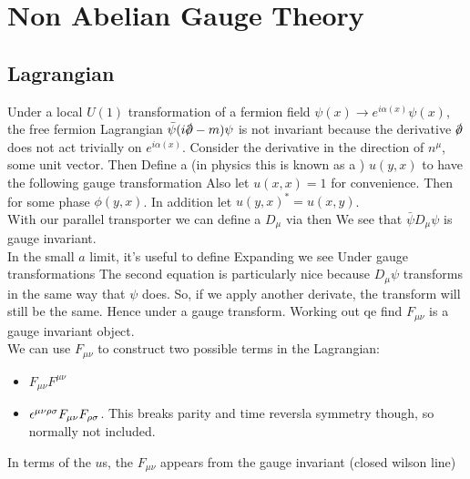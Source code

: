 \documentclass{article}
\begin{document}
\section{Non Abelian Gauge Theory}

\subsection{Lagrangian}
Under a local $U(1)$ transformation of a fermion field $\psi(x) \to e^{i\alpha(x)} \psi(x)$, the free fermion Lagrangian $\bar{\psi}(i\slashed{\del}-m)\psi$ is not invariant because the derivative $\slashed{\del}$ does not act trivially on $e^{i\alpha(x)}$. Consider the derivative in the direction of $n^\mu$, some unit vector. Then 
Define a  (in physics this is known as a ) $u(y,x)$ to have the following gauge transformation 
Also let $u(x,x) = 1$ for convenience. Then 
for some phase $\phi(y,x)$. In addition let $u(y,x)^\ast = u(x,y)$. \\
With our parallel transporter we can define a  $D_\mu$ via 
then 
We see that $\bar{\psi}D_\mu \psi$ is gauge invariant. \\
In the small $a$ limit, it's useful to define 
Expanding we see 
Under gauge transformations 
The second equation is particularly nice because $D_\mu \psi$ transforms in the same way that $\psi$ does. So, if we apply another derivate, the transform will still be the same. Hence 
under a gauge transform. Working out qe find 
$F_{\mu\nu}$ is a gauge invariant object.\\
We can use $F_{\mu\nu}$ to construct two possible terms in the Lagrangian:
\begin{itemize}
    \item $F_{\mu\nu}F^{\mu\nu}$
    \item $\epsilon^{\mu\nu\rho\sigma}F_{\mu\nu}F_{\rho\sigma}$. This breaks parity and time reversla symmetry though, so normally not included. 
\end{itemize}
In terms of the $u$s, the $F_{\mu\nu}$ appears from the gauge invariant  (closed wilson line)
\end{document}
